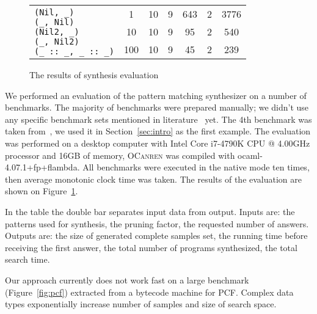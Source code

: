 \begin{figure}[t]
\begin{tabular}{|m{3cm}|cc||cccc|}
    \\
        \hline
        \multirow{3}{*}{
          \parbox{3cm}{
            \vskip2mm
\lstinline[basicstyle=\scriptsize]|(Nil, _)|\\[-1mm]
\lstinline[basicstyle=\scriptsize]|(_, Nil)|\\[-1mm]
\lstinline[basicstyle=\scriptsize]|(Nil2, _)|\\[-1mm]
\lstinline[basicstyle=\scriptsize]|(_, Nil2)|\\[-1mm]
\lstinline[basicstyle=\scriptsize]|(_ :: _, _ :: _)|}}
         & 1&10&9&643&2&3776\\[3mm]
        \cline{2-7}
      &10&10&9&95&2&540\\[3mm]
        \cline{2-7}
     &100&10&9&45&2&239                    \\ \hline
  \end{tabular}
  \caption{The results of synthesis evaluation}
  \label{fig:eval}

\end{figure}


We performed an evaluation of the pattern matching synthesizer on a number of benchmarks.
The majority of benchmarks were prepared manually; we didn't use any specific benchmark sets mentioned in literature~\cite{matching2000} yet.
The 4th benchmark was taken from~\cite{maranget2008}, we used it in Section~\ref{sec:intro} as the first example. 
The evaluation was performed on a desktop computer with Intel Core i7-4790K CPU @ 4.00GHz processor and 16GB of memory,
\textsc{OCanren} was compiled with \mbox{ocaml-4.07.1+fp+flambda}. All benchmarks were executed in the native mode ten times,
then average monotonic clock time was taken. The results of the evaluation are shown on Figure~\ref{fig:eval}.

In the table the double bar separates input data from output. Inputs are: the patterns used for synthesis, the pruning factor,
the requested number of answers. Outputs are: the size of generated complete samples set, the running time before receiving the
first answer, the total number of programs synthesized, the total search time.

Our approach currently does not work fast on a large benchmark (Figure~\ref{fig:pcf}) extracted from a bytecode
machine for PCF. Complex data types exponentially increase number of samples and size of search space.

